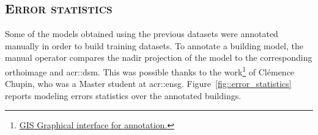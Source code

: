     \subsection{\textsc{Error statistics}}
        \label{subsec::experiments::datasets::stats}

        Some of the models obtained using the previous datasets were annotated manually in order to build training datasets.
        To annotate a building model, the manual operator compares the nadir projection of the model to the corresponding orthoimage and \gls{acr::dsm}.
        This was possible thanks to the work\footnote{\href{https://github.com/CHUPClem/sGrISner.git}{GIS Graphical interface for annotation.}} of Clémence Chupin, who was a Master student at \gls{acr::ensg}.
        Figure~\ref{fig::error_statistics} reports modeling errors statistics over the annotated buildings.

        \begin{figure}[htpb]
            \centering
        \end{figure}
        \begin{figure}[htpb]
            \centering
        \end{figure}

